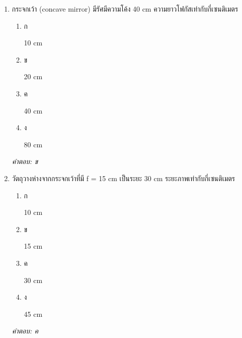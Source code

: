 \documentclass[12pt]{article}
\begin{document}
\begin{enumerate}[label=\arabic*., itemsep=0.5\baselineskip, topsep=0.5\baselineskip, leftmargin=*]
\item กระจกเว้า (concave mirror) มีรัศมีความโค้ง 40 cm ความยาวโฟกัสเท่ากับกี่เซนติเมตร
\begin{enumerate}[label=\alph*)., itemsep=0.3\baselineskip, topsep=0.3\baselineskip]
\item ก\ 
\begin{minipage}[t]{0.9\linewidth}
\raggedright 10 cm
\end{minipage}
\item ข\ 
\begin{minipage}[t]{0.9\linewidth}
\raggedright 20 cm
\end{minipage}
\item ค\ 
\begin{minipage}[t]{0.9\linewidth}
\raggedright 40 cm
\end{minipage}
\item ง\ 
\begin{minipage}[t]{0.9\linewidth}
\raggedright 80 cm
\end{minipage}
\end{enumerate}
\vspace{-0.3\baselineskip}
\begin{small}
\textit{คำตอบ: ข}
\end{small}

\item วัตถุวางห่างจากกระจกเว้าที่มี f = 15 cm เป็นระยะ 30 cm ระยะภาพเท่ากับกี่เซนติเมตร
\begin{enumerate}[label=\alph*)., itemsep=0.3\baselineskip, topsep=0.3\baselineskip]
\item ก\ 
\begin{minipage}[t]{0.9\linewidth}
\raggedright 10 cm
\end{minipage}
\item ข\ 
\begin{minipage}[t]{0.9\linewidth}
\raggedright 15 cm
\end{minipage}
\item ค\ 
\begin{minipage}[t]{0.9\linewidth}
\raggedright 30 cm
\end{minipage}
\item ง\ 
\begin{minipage}[t]{0.9\linewidth}
\raggedright 45 cm
\end{minipage}
\end{enumerate}
\vspace{-0.3\baselineskip}
\begin{small}
\textit{คำตอบ: ค}
\end{small}


\end{enumerate}
\end{document}
